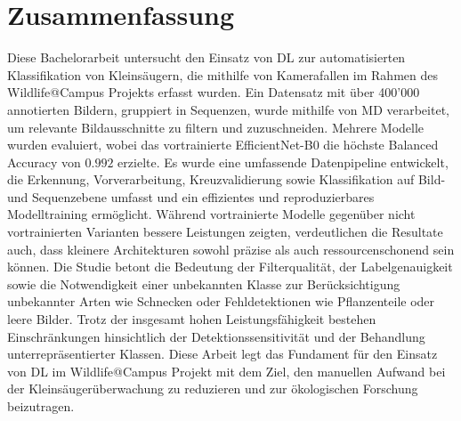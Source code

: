 \section*{Zusammenfassung}
Diese Bachelorarbeit untersucht den Einsatz von \ac{DL} zur automatisierten Klassifikation von Kleinsäugern, die mithilfe von Kamerafallen im Rahmen des Wildlife@Campus Projekts erfasst wurden.
Ein Datensatz mit über 400'000 annotierten Bildern, gruppiert in Sequenzen, wurde mithilfe von \acl{MD} verarbeitet, um relevante Bildausschnitte zu filtern und zuzuschneiden.
Mehrere Modelle wurden evaluiert, wobei das vortrainierte EfficientNet-B0 die höchste Balanced Accuracy von \(0.992\) erzielte.
Es wurde eine umfassende Datenpipeline entwickelt, die Erkennung, Vorverarbeitung, Kreuzvalidierung sowie Klassifikation auf Bild- und Sequenzebene umfasst und ein effizientes und reproduzierbares Modelltraining ermöglicht.
Während vortrainierte Modelle gegenüber nicht vortrainierten Varianten bessere Leistungen zeigten, verdeutlichen die Resultate auch, dass kleinere Architekturen sowohl präzise als auch ressourcenschonend sein können.
Die Studie betont die Bedeutung der Filterqualität, der Labelgenauigkeit sowie die Notwendigkeit einer unbekannten Klasse zur Berücksichtigung unbekannter Arten wie Schnecken oder Fehldetektionen wie Pflanzenteile oder leere Bilder.
Trotz der insgesamt hohen Leistungsfähigkeit bestehen Einschränkungen hinsichtlich der Detektionssensitivität und der Behandlung unterrepräsentierter Klassen.
Diese Arbeit legt das Fundament für den Einsatz von \ac{DL} im Wildlife@Campus Projekt mit dem Ziel, den manuellen Aufwand bei der Kleinsäugerüberwachung zu reduzieren und zur ökologischen Forschung beizutragen.
